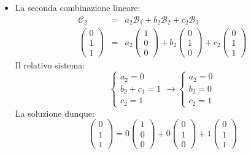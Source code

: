 \documentclass[a4paper]{article}
\begin{document}
\begin{itemize}
		\item La seconda combinazione lineare:
		\begin{equation*}
			\begin{array}{rll}
				\mathcal{C}_{2} &=& a_{2}\mathcal{B}_{1} + b_{2}\mathcal{B}_{2} + c_{2}\mathcal{B}_{3} \\ [2em]
				\begin{pmatrix}
					0 \\ 1 \\ 1
				\end{pmatrix} &=& a_{2} \begin{pmatrix}
					1 \\ 0 \\ 0
				\end{pmatrix} + b_{2} \begin{pmatrix}
					0 \\ 1 \\ 0
				\end{pmatrix} + c_{2} \begin{pmatrix}
					0 \\ 1 \\ 1
				\end{pmatrix}
			\end{array}
		\end{equation*}
		Il relativo sistema:
		\begin{equation*}
			\begin{cases}
				a_{2} = 0 \\
				b_{2} + c_{1} = 1 \\
				c_{2} = 1
			\end{cases} \longrightarrow
			\begin{cases}
				a_{2} = 0 \\
				b_{2} = 0 \\
				c_{2} = 1
			\end{cases}
		\end{equation*}
		La soluzione dunque:
		\begin{equation*}
			\begin{pmatrix}
				0 \\ 1 \\ 1
			\end{pmatrix} = 0 \begin{pmatrix}
				1 \\ 0 \\ 0
			\end{pmatrix} + 0 \begin{pmatrix}
				0 \\ 1 \\ 0
			\end{pmatrix} + 1 \begin{pmatrix}
				0 \\ 1 \\ 1
			\end{pmatrix}
		\end{equation*}
		

\end{itemize}
\end{document}
